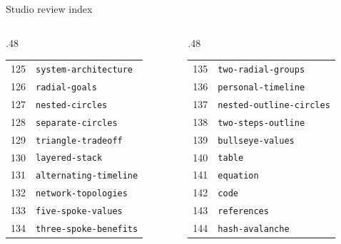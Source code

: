 \documentclass[aspectratio=169]{beamer}
\begin{document}
\begin{frame}{Studio review index}\fontsize{6.5}{9}\selectfont\begin{columns}[T]
\begin{column}{.48\textwidth}\begin{tabular}{rl}
125 & \texttt{system-architecture} \\
126 & \texttt{radial-goals} \\
127 & \texttt{nested-circles} \\
128 & \texttt{separate-circles} \\
129 & \texttt{triangle-tradeoff} \\
130 & \texttt{layered-stack} \\
131 & \texttt{alternating-timeline} \\
132 & \texttt{network-topologies} \\
133 & \texttt{five-spoke-values} \\
134 & \texttt{three-spoke-benefits} \\
\end{tabular}\end{column}
\begin{column}{.48\textwidth}\begin{tabular}{rl}
135 & \texttt{two-radial-groups} \\
136 & \texttt{personal-timeline} \\
137 & \texttt{nested-outline-circles} \\
138 & \texttt{two-steps-outline} \\
139 & \texttt{bullseye-values} \\
140 & \texttt{table} \\
141 & \texttt{equation} \\
142 & \texttt{code} \\
143 & \texttt{references} \\
144 & \texttt{hash-avalanche} \\
\end{tabular}\end{column}
\end{columns}\end{frame}
\end{document}
